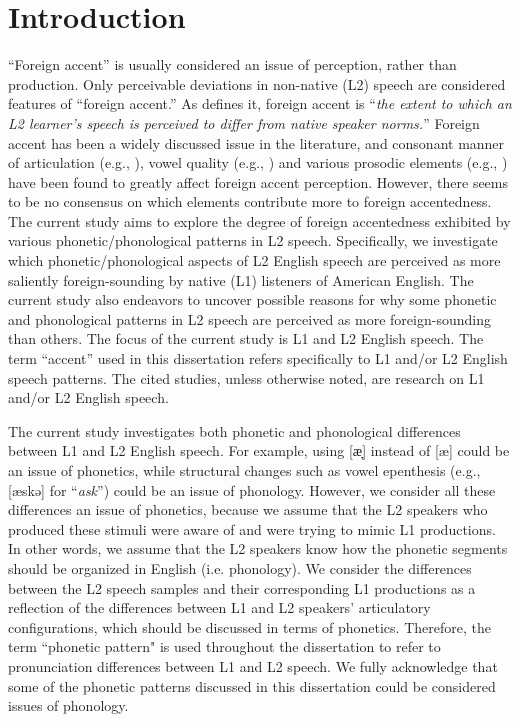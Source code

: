 
\chapter{Introduction}
\label{ch:1}

“Foreign accent” is usually considered an issue of perception, rather than production. Only  perceivable deviations in non-native (L2) speech are considered features of “foreign accent.” As \citet[p.160]{Munro_1998} defines it, foreign accent is “\textit{the extent to which an L2 learner’s speech is perceived to differ from native speaker norms.}” Foreign accent has been a widely discussed issue in the literature, and consonant manner of articulation (e.g., \citealp{Riney_1999, Solon_2015}), vowel quality (e.g., \citealp{Hahn_2004, Munro_2001, Zielinski_2008}) and various prosodic elements (e.g., \citealp{Hahn_2004, Munro_2001, Zielinski_2008}) have been found to greatly affect foreign accent perception. However, there seems to be no consensus on which elements contribute more to foreign accentedness. The current study aims to explore the degree of foreign accentedness exhibited by various phonetic/phonological patterns in L2 speech. Specifically, we investigate which phonetic/phonological aspects of L2 English speech are perceived as more saliently foreign-sounding by native (L1) listeners of American English. The current study also endeavors to uncover possible reasons for why some phonetic and phonological patterns in L2 speech are perceived as more foreign-sounding than others. The focus of the current study is L1 and L2 English speech. The term “accent” used in this dissertation refers specifically to L1 and/or L2 English speech patterns. The cited studies, unless otherwise noted, are research on L1 and/or L2 English speech.

The current study investigates both phonetic and phonological differences between L1 and L2 English speech. For example, using [æ̞] instead of [æ] could be an issue of phonetics, while structural changes such as vowel epenthesis (e.g.,  [æskə] for “\textit{ask}”) could be an issue of phonology. However, we consider all these differences an issue of phonetics, because we assume that the L2 speakers who produced these stimuli were aware of and were trying to mimic L1 productions. In other words, we assume that the L2 speakers know how the phonetic segments should be organized in English (i.e. phonology). We consider the differences between the L2 speech samples and their corresponding L1 productions as a reflection of the differences between L1 and L2 speakers' articulatory configurations, which should be discussed in terms of phonetics. Therefore, the term ``phonetic pattern" is used throughout the dissertation to refer to pronunciation differences between L1 and L2 speech. We fully acknowledge that some of the phonetic patterns discussed in this dissertation could be considered issues of phonology. 

